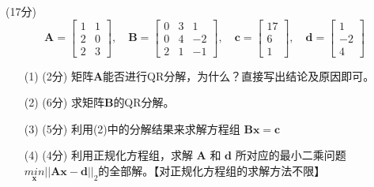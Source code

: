 \documentclass[12pt,a4paper,openany,twoside]{ctexbook}
\begin{document}
\begin{exercise}\quad(17分)
	$$
	\mathbf{A}=\begin{bmatrix}  
		1 & 1 \\  
		2 & 0 \\
		2 & 3 
		\end{bmatrix},\quad
		\mathbf{B}=\begin{bmatrix}  
		0 & 3 & 1 \\  
		0 & 4 & -2 \\
		2 & 1 & -1
		\end{bmatrix},\quad
		\mathbf{c}=\begin{bmatrix}  
		17 \\  
		6 \\
		1 
		\end{bmatrix},\quad
		\mathbf{d}=\begin{bmatrix}  
		1 \\  
		-2 \\
		4
		\end{bmatrix}
	$$
	\begin{itemize}
		\item [(1)](2分) 矩阵$\mathbf{A}$能否进行QR分解，为什么？直接写出结论及原因即可。
		\item [(2)](6分) 求矩阵$\mathbf{B}$的QR分解。
		\item [(3)](5分) 利用(2)中的分解结果来求解方程组 $\mathbf{Bx}= \mathbf{c}$
		\item [(4)](4分) 利用正规化方程组，求解 $\mathbf{A}$ 和 $\mathbf{d}$ 所对应的最小二乘问题 $\underset{\mathbf{x}}{min}||\mathbf{A}\mathbf{x}-\mathbf{d}||_2$​ 的全部解。【对正规化方程组的求解方法不限】
	\end{itemize}

\end{exercise}
\end{document}
